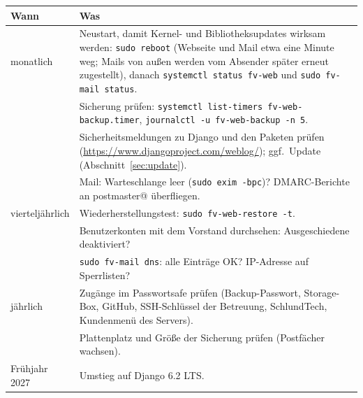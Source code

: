 \documentclass[a4paper,fontsize=10pt]{scrartcl}
\newcommand*{\cmd}[1]{\texttt{#1}}
\begin{document}
\begin{center}
\small
\begin{tabularx}{\textwidth}{@{}lX@{}}
\toprule
\textbf{Wann} & \textbf{Was} \\
\midrule
monatlich     & Neustart, damit Kernel- und Bibliotheksupdates wirksam werden:
                \cmd{sudo reboot} (Webseite und Mail etwa eine Minute weg; Mails von
                außen werden vom Absender später erneut zugestellt), danach
                \cmd{systemctl status fv-web} und \cmd{sudo fv-mail status}. \\
              & Sicherung prüfen: \cmd{systemctl list-timers fv-web-backup.timer},
                \cmd{journalctl -u fv-web-backup -n 5}. \\
              & Sicherheitsmeldungen zu Django und den Paketen prüfen
                (\url{https://www.djangoproject.com/weblog/}); ggf.\ Update
                (Abschnitt~\ref{sec:update}). \\
              & Mail: Warteschlange leer (\cmd{sudo exim -bpc})? DMARC-Berichte an
                postmaster@ überfliegen. \\
vierteljährlich & Wiederherstellungstest: \cmd{sudo fv-web-restore -t}. \\
              & Benutzerkonten mit dem Vorstand durchsehen: Ausgeschiedene deaktiviert? \\
              & \cmd{sudo fv-mail dns}: alle Einträge OK? IP-Adresse auf Sperrlisten? \\
jährlich      & Zugänge im Passwortsafe prüfen (Backup-Passwort, Storage-Box, GitHub,
                SSH-Schlüssel der Betreuung, SchlundTech, Kundenmenü des Servers). \\
              & Plattenplatz und Größe der Sicherung prüfen (Postfächer wachsen). \\
Frühjahr 2027 & Umstieg auf Django 6.2 LTS. \\
\bottomrule
\end{tabularx}
\end{center}
\end{document}
